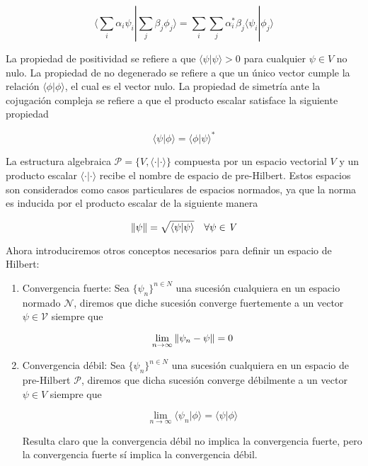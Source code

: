 \begin{equation}
    \langle \sum_i \alpha_i \psi_i | \sum_j \beta_j \phi_j \rangle = \sum_i \sum_j \alpha_i^* \beta_j \langle \psi_i | \phi_j \rangle
\end{equation}

La propiedad de positividad se refiere a que $\langle \psi | \psi \rangle > 0$ para cualquier $\psi \in \mathit{V}$ no nulo. La propiedad de no degenerado se refiere a que un único vector cumple la relación $\langle \phi | \phi \rangle$, el cual es el vector nulo. La propiedad de simetría ante la cojugación compleja se refiere a que el producto escalar satisface la siguiente propiedad

\begin{equation}
    \langle \psi | \phi \rangle = \langle \phi | \psi \rangle^*
\end{equation}

La estructura algebraica $\mathcal{P} = \{\mathit{V}, \langle \cdot | \cdot \rangle\}$ compuesta por un espacio vectorial $\mathit{V}$ y un producto escalar $\langle \cdot | \cdot \rangle$ recibe el nombre de espacio de pre-Hilbert. Estos espacios son considerados como casos particulares de espacios normados, ya que la norma es inducida por el producto escalar de la siguiente manera

\begin{equation}
    \norm{\psi} = \sqrt{\langle\psi | \psi \rangle} \quad \forall \psi \in \mathit{V}
\end{equation}

Ahora introduciremos otros conceptos necesarios para definir un espacio de Hilbert:

\begin{enumerate}
    \item Convergencia fuerte: Sea $\{\psi_n\}^{n \in N}$ una sucesión cualquiera en un espacio normado $\mathcal{N}$, diremos que diche sucesión converge fuertemente a un vector $\psi \in \mathcal{V}$ siempre que

        \begin{equation}
            \lim_{n \to \infty} \norm{\psi_n - \psi} = 0
        \end{equation}

    \item Convergencia débil: Sea $\{\psi_n\}^{n \in N}$ una sucesión cualquiera en un espacio de pre-Hilbert $\mathcal{P}$, diremos que dicha sucesión converge débilmente a un vector $\psi \in \mathit{V}$ siempre que

        \begin{equation}
            \lim_{n \to \infty} \langle \psi_n | \phi \rangle = \langle \psi | \phi \rangle
        \end{equation}

        Resulta  claro que la convergencia débil no implica la convergencia fuerte, pero la convergencia fuerte sí implica la convergencia débil.
\end{enumerate}


